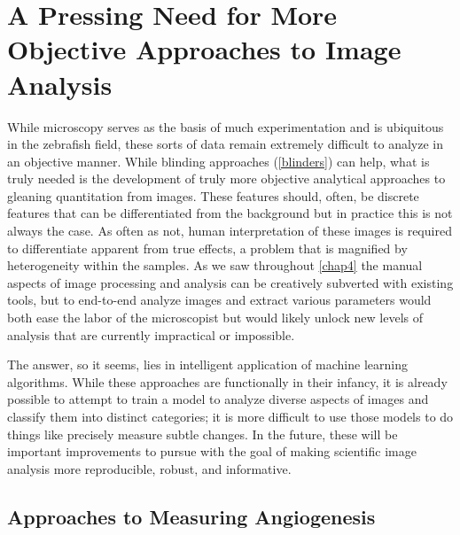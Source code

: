 \section{A Pressing Need for More Objective Approaches to Image Analysis}\label{newimaging}

While microscopy serves as the basis of much experimentation and is ubiquitous in the zebrafish field, these sorts of data remain extremely difficult to analyze in an objective manner. While blinding approaches (\autoref{blinders}) can help, what is truly needed is the development of truly more objective analytical approaches to gleaning quantitation from images. These features should, often, be discrete features that can be differentiated from the background but in practice this is not always the case. As often as not, human interpretation of these images is required to differentiate apparent from true effects, a problem that is magnified by heterogeneity within the samples. As we saw throughout \autoref{chap4} the manual aspects of image processing and analysis can be creatively subverted with existing tools, but to end\hyp{}to\hyp{}end analyze images and extract various parameters would both ease the labor of the microscopist but would likely unlock new levels of analysis that are currently impractical or impossible.

The answer, so it seems, lies in intelligent application of machine learning algorithms. While these approaches are functionally in their infancy, it is already possible to attempt to train a model to analyze diverse aspects of images and classify them into distinct categories; it is more difficult to use those models to do things like precisely measure subtle changes. In the future, these will be important improvements to pursue with the goal of making scientific image analysis more reproducible, robust, and informative.

\subsection{Approaches to Measuring Angiogenesis}\label{measureang}

